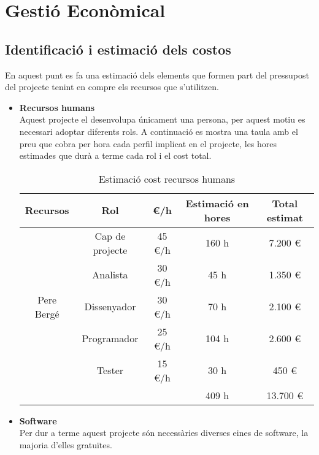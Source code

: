 
\chapter{Gestió Econòmical} %

\label{GestioEconomica} %

\section{Identificació i estimació dels costos}
En aquest punt es fa una estimació dels elements que formen part del pressupost del projecte tenint en compre els recursos que s’utilitzen.

\begin{itemize}
\item{}\textbf{Recursos humans}\\
Aquest projecte el desenvolupa únicament una persona, per aquest motiu
es necessari adoptar diferents rols. A continuació es mostra una taula amb
el preu que cobra per hora cada perfil implicat en el projecte, les hores
estimades que durà a terme cada rol i el cost total.



\begin{table}[!h]
\centering
\begin{tabular}{|c|c|c|c|c|}
\hline
\textbf{Recursos}  & \textbf{Rol} & \textbf{\euro/h} & \textbf{Estimació en hores} & \textbf{Total estimat} \\ \hline
 & Cap de projecte & 45 \euro/h & 160 h & 7.200 \euro \\ \cline {2-5}
\multicolumn{ 1}{|l|}{} & Analista & 30 \euro/h & 45 h & 1.350 \euro \\ \cline{ 2- 5}
Pere Bergé & Dissenyador & 30 \euro/h & 70 h & 2.100 \euro \\ \cline{ 2- 5}
\multicolumn{ 1}{|l|}{} & Programador & 25 \euro/h & 104 h & 2.600 \euro \\ \cline{ 2- 5}
\multicolumn{ 1}{|l|}{} & Tester & 15 \euro/h & 30 h & 450 \euro \\ \hline
\multicolumn{ 1}{|l|}{} &   &  & 409 h & 13.700 \euro \\ \hline
\end{tabular}
\label{}
\caption{Estimació cost recursos humans}
\end{table}

\item{}\textbf{Software}\\
Per dur a terme aquest projecte són necessàries diverses eines de software,
la majoria d’elles gratuïtes.


\end{itemize}
